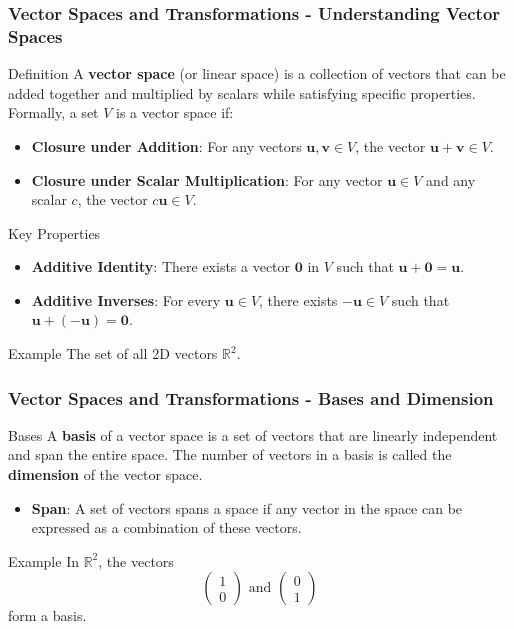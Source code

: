 \documentclass[aspectratio=169]{beamer}
\begin{document}
\begin{frame}[fragile]
    \frametitle{Vector Spaces and Transformations - Understanding Vector Spaces}
    \begin{block}{Definition}
        A \textbf{vector space} (or linear space) is a collection of vectors that can be added together and multiplied by scalars while satisfying specific properties. Formally, a set \( V \) is a vector space if:
    \end{block}
    \begin{itemize}
        \item \textbf{Closure under Addition}: For any vectors \( \mathbf{u}, \mathbf{v} \in V \), the vector \( \mathbf{u} + \mathbf{v} \in V \).
        \item \textbf{Closure under Scalar Multiplication}: For any vector \( \mathbf{u} \in V \) and any scalar \( c \), the vector \( c\mathbf{u} \in V \).
    \end{itemize}
    \begin{block}{Key Properties}
        \begin{itemize}
            \item \textbf{Additive Identity}: There exists a vector \( \mathbf{0} \) in \( V \) such that \( \mathbf{u} + \mathbf{0} = \mathbf{u} \).
            \item \textbf{Additive Inverses}: For every \( \mathbf{u} \in V \), there exists \( -\mathbf{u} \in V \) such that \( \mathbf{u} + (-\mathbf{u}) = \mathbf{0} \).
        \end{itemize}
    \end{block}
    \begin{block}{Example}
        The set of all 2D vectors \( \mathbb{R}^2 \).
    \end{block}
\end{frame}

\begin{frame}[fragile]
    \frametitle{Vector Spaces and Transformations - Bases and Dimension}
    \begin{block}{Bases}
        A \textbf{basis} of a vector space is a set of vectors that are linearly independent and span the entire space. The number of vectors in a basis is called the \textbf{dimension} of the vector space.
    \end{block}
    \begin{itemize}
        \item \textbf{Span}: A set of vectors spans a space if any vector in the space can be expressed as a combination of these vectors.
    \end{itemize}
    \begin{block}{Example}
        In \( \mathbb{R}^2 \), the vectors 
        \[
        \begin{pmatrix} 1 \\ 0 \end{pmatrix} \text{ and } \begin{pmatrix} 0 \\ 1 \end{pmatrix}
        \]
        form a basis.
    \end{block}
\end{frame}
\end{document}
